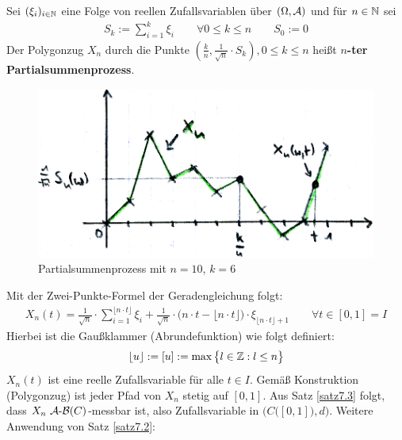 \begin{beispiel}\label{beispiel7.4}
	Sei $(\xi_i)_{i\in\mathbb{N}}$ eine Folge von reellen Zufallsvariablen über $(\Omega,\mathcal{A})$ und für $n\in\mathbb{N}$ sei
	\begin{align*}
		S_k:=\sum\limits_{i=1}^k\xi_i\qquad\forall0\leq k\leq n\qquad S_0:=0
	\end{align*}
	Der Polygonzug $X_n$ durch die Punkte $\left(\frac{k}{n},\frac{1}{\sqrt{n}}\cdot S_k\right),0\leq k\leq n$ heißt \textbf{$n$-ter Partialsummenprozess}.
	\begin{figure}[H]
		\begin{center}
			\includegraphics[width=1\textwidth]{./pics/MSTAT001.png}
			\caption{Partialsummenprozess mit $n=10$, $k=6$}
			\label{AbbPartialsummenprozess}
		\end{center}
	\end{figure}
	Mit der Zwei-Punkte-Formel der Geradengleichung folgt:
	\begin{align*}
		X_n(t)=\frac{1}{\sqrt{n}}\cdot\sum\limits_{i=1}^{\lfloor n\cdot t\rfloor}\xi_i+\frac{1}{\sqrt{n}}\cdot\big(n\cdot t-\lfloor n\cdot t\rfloor\big)\cdot\xi_{\lfloor n\cdot t\rfloor+1}\qquad\forall t\in[0,1]=I
	\end{align*}
	Hierbei ist die Gaußklammer (Abrundefunktion) wie folgt definiert:
	\begin{align*}
		\lfloor u\rfloor:=[u]:=\max\big\lbrace l\in\mathbb{Z}:l\leq n\big\rbrace
	\end{align*}
	$X_n(t)$ ist eine reelle Zufallsvariable für alle $t\in I$. 
	Gemäß Konstruktion (Polygonzug) ist jeder Pfad von $X_n$ stetig auf $[0,1]$. 
	Aus Satz \ref{satz7.3} folgt, dass $X_n~\mathcal{A}\text{-}\mathcal{B}(C)$-messbar ist, also Zufallsvariable in $\Big(C\big([0,1]\big),d\Big)$. 
	Weitere Anwendung von Satz \ref{satz7.2}:
\end{beispiel}

